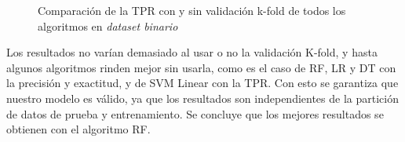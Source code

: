 \begin{figure}[h!]
    \begin{center}
    \caption{Comparación de la TPR con y sin validación k-fold de todos los algoritmos en \textit{dataset binario}}
    \label{fig:comp_recall}
    \end{center}
\end{figure}


Los resultados no varían demasiado al usar o no la validación K-fold, y hasta algunos algoritmos rinden mejor sin usarla, como es el caso de \gls{RF}, \gls{LR} y \gls{DT} con la precisión y exactitud, y de \gls{SVM} Linear con la \gls{TPR}. Con esto se garantiza que nuestro modelo es válido, ya que los resultados son independientes de la partición de datos de prueba y entrenamiento. Se concluye que los mejores resultados se obtienen con el algoritmo \gls{RF}.


